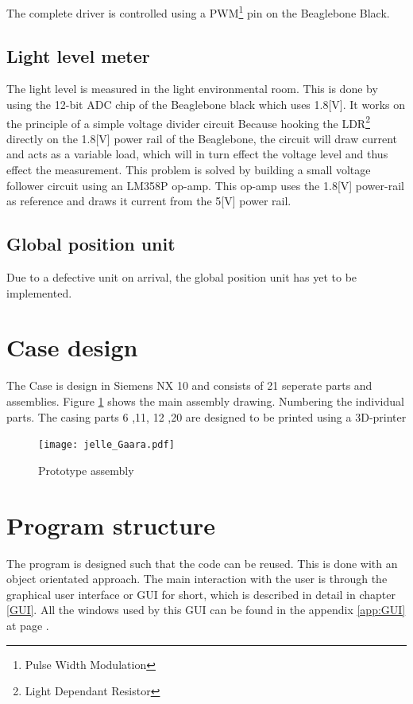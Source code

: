 \documentclass[11pt,fleqn,,a4paper,twoside,openright]{book}
\begin{document}
The complete driver is controlled using a PWM\footnote{Pulse Width Modulation} pin on the Beaglebone Black.

\subsection{Light level meter}
The light level is measured in the light environmental room. This is done by using the 12-bit ADC chip of the Beaglebone black which uses 1.8[V]. It works on the principle of a simple voltage divider circuit Because hooking the LDR\footnote{Light Dependant Resistor} directly on the 1.8[V] power rail of the Beaglebone, the circuit will draw current and acts as a variable load, which will in turn effect the voltage level and thus effect the measurement.
This problem is solved by building a small voltage follower circuit using an LM358P op-amp. This op-amp uses the 1.8[V] power-rail as reference and draws it current from the 5[V] power rail.

\subsection{Global position unit}
Due to a defective unit on arrival, the global position unit has yet to be implemented.
\newpage

\section{Case design}
The Case is design in Siemens NX 10 and consists of 21 seperate parts and assemblies. Figure \ref{fig:Design} shows the main assembly drawing. Numbering the individual parts. The casing parts 6 ,11, 12 ,20 are designed to be printed using a 3D-printer
\begin{figure}[h]
	\texttt{[image: jelle\_Gaara.pdf]}
	\caption{Prototype assembly}\label{fig:Design}
\end{figure}

\section{Program structure}
The program is designed such that the code can be reused. This is done with an object orientated approach. The main interaction with the user is through the graphical user interface or GUI for short, which is described in detail in chapter \ref{GUI}. All the windows used by this GUI can be found in the appendix \ref{app:GUI} at page \pageref{app:GUI}.
\end{document}
